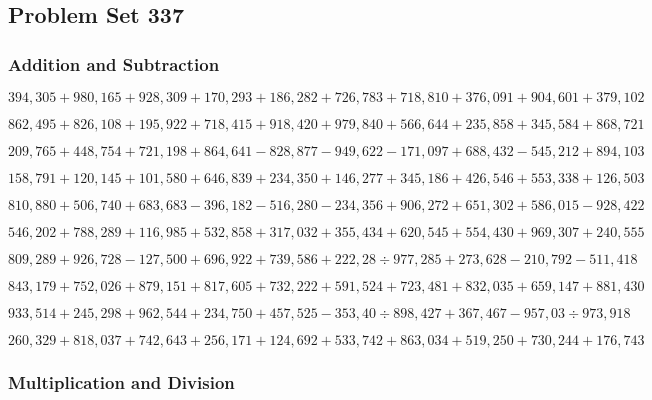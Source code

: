 \hypertarget{problem-set-337}{%
\subsection{Problem Set 337}\label{problem-set-337}}

\hypertarget{addition-and-subtraction}{%
\subsubsection{Addition and
Subtraction}\label{addition-and-subtraction}}

\(394,305+980,165+928,309+170,293+186,282+726,783+718,810+376,091+904,601+379,102\)

\(862,495+826,108+195,922+718,415+918,420+979,840+566,644+235,858+345,584+868,721\)

\(209,765+448,754+721,198+864,641-828,877-949,622-171,097+688,432-545,212+894,103\)

\(158,791+120,145+101,580+646,839+234,350+146,277+345,186+426,546+553,338+126,503\)

\(810,880+506,740+683,683-396,182-516,280-234,356+906,272+651,302+586,015-928,422\)

\(546,202+788,289+116,985+532,858+317,032+355,434+620,545+554,430+969,307+240,555\)

\(809,289+926,728-127,500+696,922+739,586+222,28÷977,285+273,628-210,792-511,418\)

\(843,179+752,026+879,151+817,605+732,222+591,524+723,481+832,035+659,147+881,430\)

\(933,514+245,298+962,544+234,750+457,525-353,40÷898,427+367,467-957,03÷973,918\)

\(260,329+818,037+742,643+256,171+124,692+533,742+863,034+519,250+730,244+176,743\)

\hypertarget{multiplication-and-division}{%
\subsubsection{Multiplication and
Division}\label{multiplication-and-division}}

